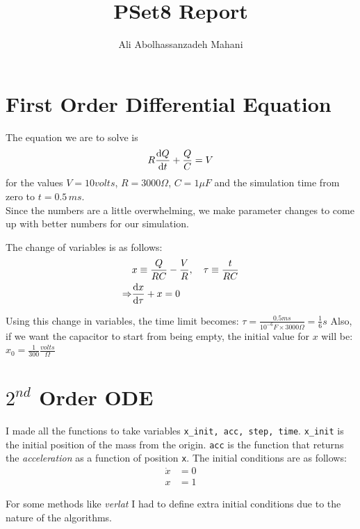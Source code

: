 \documentclass[12pt, a4paper]{article}
\title{PSet8 Report}
\author{Ali Abolhassanzadeh Mahani}
\begin{document}
	\maketitle
	\section{First Order Differential Equation}
	The equation we are to solve is
	\begin{equation}
		R \dv{Q}{t} + \frac{Q}{C} = V
	\end{equation}
	for the values $V= 10 volts$, $R = 3000 \Omega$, $C = 1 \mu F$ and the simulation time from zero to $t = 0.5\, ms$.\\
	Since the numbers are a little overwhelming, we make parameter changes to come up with better numbers for our simulation.
	
	The change of variables is as follows:
	\begin{equation}
		\begin{aligned}
			&x \equiv \frac{Q}{R C} - \frac{V}{R}, \quad \tau \equiv \frac{t}{R C}\\
			\Rightarrow  &\dv{x}{\tau} + x = 0
		\end{aligned}
	\end{equation}
	
	Using this change in variables, the time limit becomes: $\tau = \frac{0.5 ms}{10^{-6} F \times 3000 \Omega} = \frac{1}{6} s$
	Also, if we want the capacitor to start from being empty, the initial value for $x$ will be: $x_0 = \frac{1}{300} \frac{volts}{\Omega}$
	
	
	\section{$2^{nd}$ Order ODE}
	I made all the functions to take variables \texttt{x\_init, acc, step, time}. \texttt{x\_init} is the initial position of the mass from the origin.
	\texttt{acc} is the function that returns the \emph{acceleration} as a function of position \texttt{x}.
	The initial conditions are as follows:
	\begin{equation}
		\begin{aligned}
			\dot{x} &= 0\\
			x & = 1
		\end{aligned}
	\end{equation}
	
	For some methods like \emph{verlat} I had to define extra initial conditions due to the nature of the algorithms.
	
\end{document}
